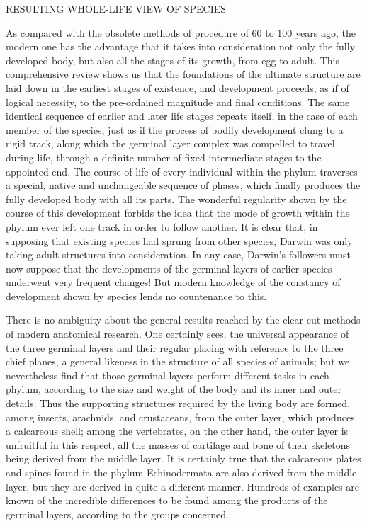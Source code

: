 RESULTING WHOLE-LIFE VIEW OF SPECIES

As compared with the obsolete methods of procedure of 60 to 100 years ago, the modern one
has the advantage that it takes into consideration not only the fully developed body, but also
all the stages of its growth, from egg to adult. This comprehensive review shows us that the
foundations of the ultimate structure are laid down in the earliest stages of existence, and
development proceeds, as if of logical necessity, to the pre-ordained magnitude and final
conditions. The same identical sequence of earlier and later life stages repeats itself, in the
case of each member of the species, just as if the process of bodily development clung to a
rigid track, along which the germinal layer complex was compelled to travel during life,
through a definite number of fixed intermediate stages to the appointed end. The course of
life of every individual within the phylum traverses a special, native and unchangeable
sequence of phases, which finally produces the fully developed body with all its parts. The
wonderful regularity shown by the course of this development forbids the idea that the mode
of growth within the phylum ever left one track in order to follow another. It is clear that, in
supposing that existing species had sprung from other species, Darwin was only taking adult
structures into consideration. In any case, Darwin's followers must now suppose that the
developments of the germinal layers of earlier species underwent very frequent changes! But
modern knowledge of the constancy of development shown by species lends no countenance
to this.

There is no ambiguity about the general results reached by the clear-cut methods of modern
anatomical research. One certainly sees, the universal appearance of the three germinal layers
and their regular placing with reference to the three chief planes, a general likeness in the
structure of all species of animals; but we nevertheless find that those germinal layers
perform different tasks in each phylum, according to the size and weight of the body and its
inner and outer details. Thus the supporting structures required by the living body are
formed, among insects, arachnids, and crustaceans, from the outer layer, which produces a
calcareous shell; among the vertebrates, on the other hand, the outer layer is unfruitful in this
respect, all the masses of cartilage and bone of their skeletons being derived from the middle
layer. It is certainly true that the calcareous plates and spines found in the phylum
Echinodermata are also derived from the middle layer, but they are derived in quite a
different manner. Hundreds of examples are known of the incredible differences to be found
among the products of the germinal layers, according to the groups concerned.

